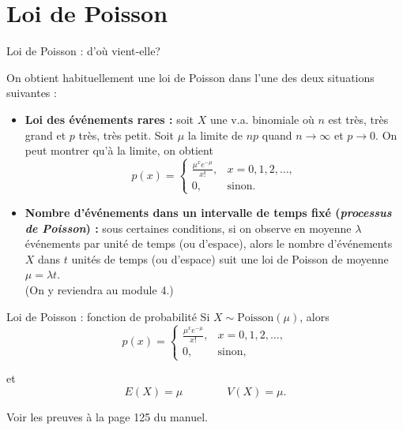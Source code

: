 \documentclass{BeamerTemplate}
\begin{document}
\section{Loi de Poisson}

\begin{frame}[t]{Loi de Poisson : d'où vient-elle?}

{\small
On obtient habituellement une loi de Poisson dans l'une des
deux situations suivantes :
\begin{itemize}
\item {\bf Loi des événements rares :} soit $X$ une
v.a. binomiale où $n$ est très, très grand et $p$
très, très petit. Soit $\mu$ la limite de $np$ quand
$n\to\infty$ et $p\to0$. On peut montrer qu'à la limite,
on obtient
$$p(x)=\left\{\begin{array}{ll}
\frac{\mu^x e^{-\mu}}{x!}, & x=0,1,2,\ldots,\\
0, & \text{sinon}.\end{array}\right.$$
\item {\bf Nombre d'événements dans un intervalle de temps fixé
({\it processus de Poisson}) :}
sous certaines conditions, si on observe en moyenne $\lambda$
événements par unité de temps (ou d'espace), alors le
nombre d'événements $X$ dans $t$ unités de temps (ou d'espace) suit
une loi de Poisson de moyenne $\mu=\lambda t$. \\
(On y reviendra au module 4.)
\end{itemize}
}
\end{frame}

\begin{frame}{Loi de Poisson : fonction de probabilité}
Si $X\sim \text{Poisson}(\mu)$, alors
$$p(x)=\left\{\begin{array}{ll}
\frac{\mu^x e^{-\mu}}{x!}, & x=0,1,2,\ldots,\\
0, & \text{sinon},\end{array}\right.$$

\vspace{0.2in}
et
$$E(X)=\mu \qquad\qquad V(X)=\mu.$$

\vspace{0.2in}
Voir les preuves à la page 125 du manuel.
\end{frame}
\end{document}
